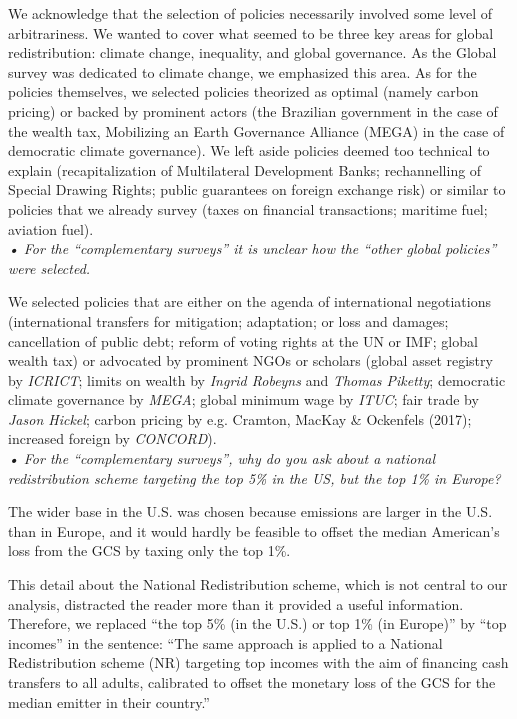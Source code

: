 \documentclass[12pt,english]{article}
\begin{document}
We acknowledge that the selection of policies necessarily involved some level of arbitrariness. We wanted to cover what seemed to be three key areas for global redistribution: climate change, inequality, and global governance. As the Global survey was dedicated to climate change, we emphasized this area. As for the policies themselves, we selected policies theorized as optimal (namely carbon pricing) or backed by prominent actors (the Brazilian government in the case of the wealth tax, Mobilizing an Earth Governance Alliance (MEGA) in the case of democratic climate governance). 
We left aside policies deemed too technical to explain (recapitalization of Multilateral Development Banks; rechannelling of Special Drawing Rights; public guarantees on foreign exchange risk) or similar to policies that we already survey (taxes on financial transactions; maritime fuel; aviation fuel). 
~\\

\textit{• For the “complementary surveys” it is unclear how the “other global policies” were selected.}

We selected policies that are either on the agenda of international negotiations (international transfers for mitigation; adaptation; or loss and damages; cancellation of public debt; reform of voting rights at the UN or IMF; global wealth tax) or advocated by prominent NGOs or scholars (global asset registry by \textit{ICRICT}; limits on wealth by \textit{Ingrid Robeyns} and \textit{Thomas Piketty}; democratic climate governance by \textit{MEGA}; global minimum wage by \textit{ITUC}; %
fair trade by \textit{Jason Hickel}; carbon pricing by e.g. Cramton, MacKay \& Ockenfels (2017); increased foreign by \textit{CONCORD}). 
~\\

\textit{• For the “complementary surveys”, why do you ask about a national redistribution scheme targeting the top 5\% in the US, but the top 1\% in Europe?}

The wider base in the U.S. was chosen because emissions are larger in the U.S. than in Europe, and it would hardly be feasible to offset the median American's loss from the GCS by taxing only the top 1\%. 

This detail about the National Redistribution scheme, which is not central to our analysis, distracted the reader more than it provided a useful information. Therefore, we replaced ``the top 5\% (in the U.S.) or top 1\% (in Europe)'' by ``top incomes'' in the sentence: ``The same approach is applied to a National Redistribution scheme (NR) targeting top incomes with the aim of financing cash transfers to all adults, calibrated to offset the monetary loss of the GCS for the median emitter in their country.''
~\\
\end{document}
